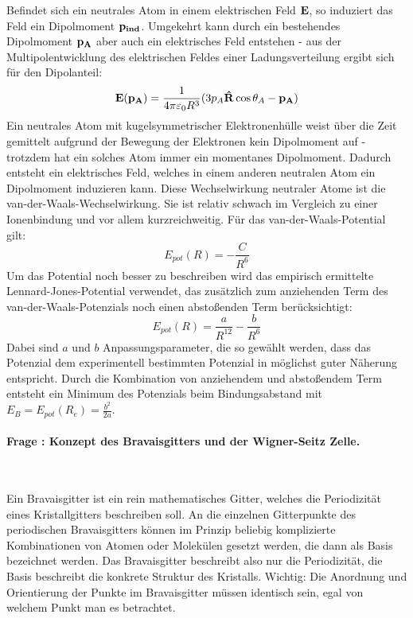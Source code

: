 \documentclass[a4paper, 11pt, ngerman, parskip=half-]{scrartcl}
\newcounter{question}
\newcommand{\question}[1]{\stepcounter{question}\paragraph{Frage \thequestion: #1}~}
\begin{document}
Befindet sich ein neutrales Atom in einem elektrischen Feld $\vb{E}$, so induziert das Feld ein Dipolmoment $\vb{p_{ind}}$. Umgekehrt kann durch ein bestehendes Dipolmoment $\vb{p_A}$ aber auch ein elektrisches Feld entstehen - aus der Multipolentwicklung des elektrischen Feldes einer Ladungsverteilung ergibt sich für den Dipolanteil:
\begin{equation*}
    \vb{E}(\vb{p_A}) = \frac{1}{4\pi\varepsilon_0 R^3} (3 p_A \vb{\hat{R}} \cos{\theta_A} - \vb{p_A})
\end{equation*}
Ein neutrales Atom mit kugelsymmetrischer Elektronenhülle weist über die Zeit gemittelt aufgrund der Bewegung der Elektronen kein Dipolmoment auf - trotzdem hat ein solches Atom immer ein momentanes Dipolmoment. Dadurch entsteht ein elektrisches Feld, welches in einem anderen neutralen Atom ein Dipolmoment induzieren kann. Diese Wechselwirkung neutraler Atome ist die van-der-Waals-Wechselwirkung. Sie ist relativ schwach im Vergleich zu einer Ionenbindung und vor allem kurzreichweitig. Für das van-der-Waals-Potential gilt:
\begin{equation*}
    E_{pot}(R) = -\frac{C}{R^6}
\end{equation*}
Um das Potential noch besser zu beschreiben wird das empirisch ermittelte Lennard-Jones-Potential verwendet, das zusätzlich zum anziehenden Term des van-der-Waals-Potenzials noch einen abstoßenden Term berücksichtigt:
\begin{equation*}
    E_{pot}(R) = \frac{a}{R^{12}} - \frac{b}{R^6}
\end{equation*}
Dabei sind $a$ und $b$ Anpassungsparameter, die so gewählt werden, dass das Potenzial dem experimentell bestimmten Potenzial in möglichst guter Näherung entspricht. Durch die Kombination von anziehendem und abstoßendem Term entsteht ein Minimum des Potenzials beim Bindungsabstand mit $E_B = E_{pot}(R_e) = \frac{b^2}{2a}$.


\question{Konzept des Bravaisgitters und der Wigner-Seitz Zelle.}
\label{q:54}

Ein Bravaisgitter ist ein rein mathematisches Gitter, welches die Periodizität eines Kristallgitters beschreiben soll. An die einzelnen Gitterpunkte des periodischen Bravaisgitters können im Prinzip beliebig komplizierte Kombinationen von Atomen oder Molekülen gesetzt werden, die dann als Basis bezeichnet werden. Das Bravaisgitter beschreibt also nur die Periodizität, die Basis beschreibt die konkrete Struktur des Kristalls. Wichtig: Die Anordnung und Orientierung der Punkte im Bravaisgitter müssen identisch sein, egal von welchem Punkt man es betrachtet.
\end{document}
